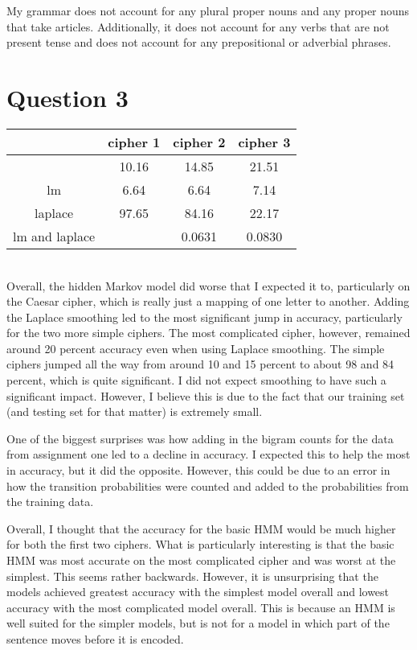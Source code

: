 \documentclass{article}
\begin{document}
My grammar does not account for any plural proper nouns and any proper nouns that take articles.  Additionally, it does not account for any verbs that are not present tense and does not account for any prepositional or adverbial phrases.

\section{Question 3}
\begin{tabular}{|c|c|c|c|}
\hline
&cipher 1 & cipher 2 & cipher 3\\
\hline
& 10.16 & 14.85 & 21.51\\
\hline
lm & 6.64 & 6.64 & 7.14\\
\hline
laplace & 97.65 & 84.16 & 22.17\\
\hline
lm and laplace & & 0.0631 & 0.0830\\
\hline
\end{tabular}\\

Overall, the hidden Markov model did worse that I expected it to, particularly on the Caesar cipher, which is really just a mapping of one letter to another.  Adding the Laplace smoothing led to the most significant jump in accuracy, particularly for the two more simple ciphers.  The most complicated cipher, however, remained around 20 percent accuracy even when using Laplace smoothing.  The simple ciphers jumped all the way from around 10 and 15 percent to about 98 and 84 percent, which is quite significant.  I did not expect smoothing to have such a significant impact.  However, I believe this is due to the fact that our training set (and testing set for that matter) is extremely small.\par
One of the biggest surprises was how adding in the bigram counts for the data from assignment one led to a decline in accuracy.  I expected this to help the most in accuracy, but it did the opposite.  However, this could be due to an error in how the transition probabilities were counted and added to the probabilities from the training data.\par
Overall, I thought that the accuracy for the basic HMM would be much higher for both the first two ciphers.  What is particularly interesting is that the basic HMM was most accurate on the most complicated cipher and was worst at the simplest.  This seems rather backwards.  However, it is unsurprising that the models achieved greatest accuracy with the simplest model overall and lowest accuracy with the most complicated model overall.  This is because an HMM is well suited for the simpler models, but is not for a model in which part of the sentence moves before it is encoded.
\end{document}
